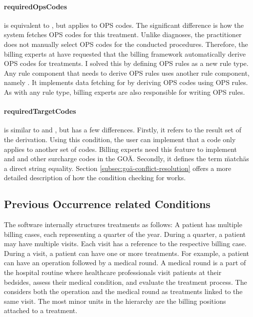 \paragraph{requiredOpsCodes}
 is equivalent to , but applies to OPS codes.
The significant difference is how the system fetches OPS codes for this treatment.
Unlike diagnoses, the practitioner does not manually select OPS codes for the conducted procedures.
Therefore, the billing experts at \AV have requested that the billing framework automatically derive OPS codes for treatments.
I solved this by defining OPS rules as a new rule type.
Any rule component that needs to derive OPS rules uses another rule component, namely .
It implements data fetching for  by deriving OPS codes using OPS rules.
As with any rule type, billing experts are also responsible for writing OPS rules.

\paragraph{requiredTargetCodes}\label{par:requiredTargetCodes}
\requiredTargetCodes is similar to  and , but has a few differences.
Firstly, it refers to the result set of the derivation.
Using this condition, the user can implement that a code only applies to another set of codes.
Billing experts need this feature to implement  and  and other surcharge codes in the GOÄ.
Secondly, it defines the term \"match\" as a direct string equality.
Section \ref{subsec:goä-conflict-resolution} offers a more detailed description of how the condition checking for  works.

\subsection{Previous Occurrence related Conditions}\label{subsec:previous-occurrence-related}

The software internally structures treatments as follows:
A patient has multiple billing cases, each representing a quarter of the year.
During a quarter, a patient may have multiple visits.
Each visit has a reference to the respective billing case.
During a visit, a patient can have one or more treatments.
For example, a patient can have an operation followed by a medical round.
A medical round is a part of the hospital routine where healthcare professionals visit patients at their bedsides,
assess their medical condition, and evaluate the treatment process.
The \AVS considers both the operation and the medical round as treatments linked to the same visit.
The most minor units in the hierarchy are the billing positions attached to a treatment.

